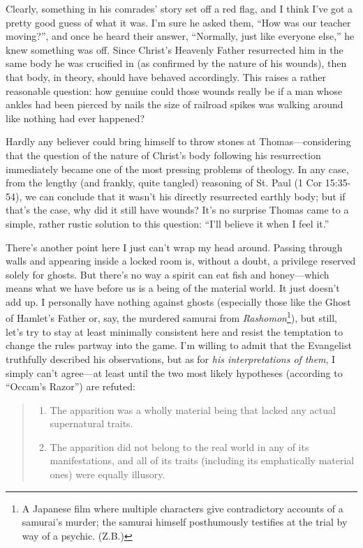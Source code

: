 Clearly, something in his comrades' story set off a red flag, and I think I've got a pretty good guess of what it was. I'm sure he asked them, ``How was our teacher moving?'', and once he heard their answer, ``Normally, just like everyone else,'' he knew something was off. Since Christ's Heavenly Father resurrected him in the same body he was crucified in (as confirmed by the nature of his wounds), then that body, in theory, should have behaved accordingly. This raises a rather reasonable question: how genuine could those wounds really be if a man whose ankles had been pierced by nails the size of railroad spikes was walking around like nothing had ever happened?

Hardly any believer could bring himself to throw stones at Thomas---considering that the question of the nature of Christ's body following his resurrection immediately became one of the most pressing problems of theology. In any case, from the lengthy (and frankly, quite tangled) reasoning of St. Paul (1 Cor 15:35-54), we can conclude that it wasn't his directly resurrected earthly body; but if that's the case, why did it still have wounds? It's no surprise Thomas came to a simple, rather rustic solution to this question: ``I'll believe it when I feel it.''

There's another point here I just can't wrap my head around. Passing through walls and appearing inside a locked room is, without a doubt, a privilege reserved solely for ghosts. But there's no way a spirit can eat fish and honey---which means what we have before us is a being of the material world. It just doesn't add up. I personally have nothing against ghosts (especially those like the Ghost of Hamlet's Father or, say, the murdered samurai from \emph{Rashomon}\footnote{A Japanese film where multiple characters give contradictory accounts of a samurai's murder; the samurai himself posthumously testifies at the trial by way of a psychic. (Z.B.)}), but still, let's try to stay at least minimally consistent here and resist the temptation to change the rules partway into the game. I'm willing to admit that the Evangelist truthfully described his observations, but as for \emph{his interpretations of them}, I simply can't agree---at least until the two most likely hypotheses (according to ``Occam's Razor'') are refuted:

\begin{quote}
\begin{enumerate}
    \item[1.] The apparition was a wholly material being that lacked any actual supernatural traits.
    \item[2.] The apparition did not belong to the real world in any of its manifestations, and all of its traits (including its emphatically material ones) were equally illusory.
\end{enumerate}
\end{quote}

